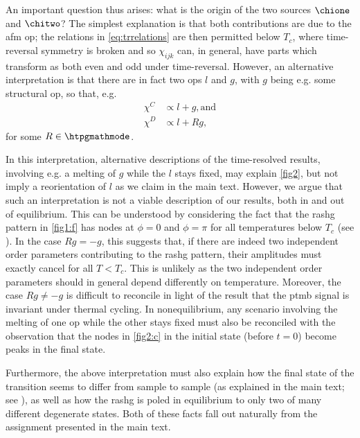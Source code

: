 An important question thus arises: what is the origin of the two sources $\chione$ and $\chitwo$?
The simplest explanation is that both contributions are due to the \gls{afm} \gls{op}; the relations in \cref{eq:trrelations} are then permitted below $T_c$, where time-reversal symmetry is broken and so $\chi_{ijk}$ can, in general, have parts which transform as both even and odd under time-reversal.
However, an alternative interpretation is that there are in fact two \glspl{op} $l$ and $g$, with $g$ being e.g. some structural \gls{op}, so that, e.g.
\begin{equation}
\label{eq:proptolg}
\begin{aligned}
\chi^C &\propto l + g, \text{and} \\
\chi^D &\propto l + Rg,
\end{aligned}
\end{equation}
for some $R \in \htpgmathmode$.

In this interpretation, alternative descriptions of the time-resolved results, involving e.g. a melting of $g$ while the $l$ stays fixed, may explain \cref{fig2}, but not imply a reorientation of $l$ as we claim in the main text.
However, we argue that such an interpretation is not a viable description of our results, both in and out of equilibrium.
This can be understood by considering the fact that the \gls{rashg} pattern in \cref{fig1:f} has nodes at $\phi=0$ and $\phi=\pi$ for all temperatures below $T_c$ (see ).
In the case $Rg = -g$, this suggests that, if there are indeed two independent order parameters contributing to the \gls{rashg} pattern, their amplitudes must exactly cancel for all $T < T_c$.
This is unlikely as the two independent order parameters should in general depend differently on temperature.
Moreover, the case $Rg \neq -g$ is difficult to reconcile in light of the result that the \gls{ptmb} signal is invariant under thermal cycling.
In nonequilibrium, any scenario involving the melting of one \gls{op} while the other stays fixed must also be reconciled with the observation that the nodes in \cref{fig2:c} in the initial state (before $t=0$) become peaks in the final state.

Furthermore, the above interpretation must also explain how the final state of the transition seems to differ from sample to sample (as explained in the main text; see ), as well as how the \gls{rashg} is poled in equilibrium to only two of many different degenerate states.
Both of these facts fall out naturally from the assignment presented in the main text.

